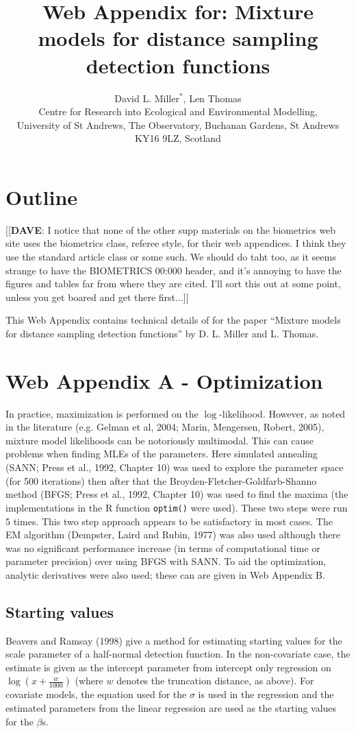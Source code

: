 \documentclass[useAMS,referee]{biom}
\title[Mixture model detection functions]{Web Appendix for: Mixture models for distance sampling detection functions}
\author{David L. Miller$^{*}$\email{dave@ninepointeightone.net}, 
Len Thomas\\
Centre for Research into Ecological and Environmental Modelling,\\
University of St Andrews, The Observatory, Buchanan Gardens, St Andrews KY16 9LZ, Scotland}
\begin{document}
\label{firstpage}

\maketitle

\section*{Outline}

[[\textbf{DAVE}: I notice that none of the other supp materials on the biometrics web site uses the biometrics class, referee style, for their web appendices.  I think they use the standard article class or some such.  We should do taht too, as it seems strange to have the BIOMETRICS 00:000 header, and it's annoying to have the figures and tables far from where they are cited.  I'll sort this out at some point, unless you get boared and get there first...]]

This Web Appendix contains technical details of for the paper ``Mixture models for distance sampling detection functions'' by D. L. Miller and L. Thomas.

\section*{Web Appendix A - Optimization}
\label{s:optimization}

In practice, maximization is performed on the $\log$-likelihood. However, as noted in the literature (e.g. Gelman et al, 2004; Marin, Mengersen, Robert, 2005), mixture model likelihoods can be notoriously multimodal. This can cause problems when finding MLEs of the parameters. Here simulated annealing (SANN; Press et al., 1992, Chapter 10) was used to explore the parameter space (for 500 iterations) then after that the Broyden-Fletcher-Goldfarb-Shanno method (BFGS; Press et al., 1992, Chapter 10) was used to find the maxima (the implementations in the \textsf{R} function \texttt{optim()} were used). These two steps were run 5 times. This two step approach appears to be satisfactory in most cases. The EM algorithm (Dempster, Laird and Rubin, 1977) was also used although there was no significant performance increase (in terms of computational time or parameter precision) over using BFGS with SANN. To aid the optimization, analytic derivatives were also used; these can are given in Web Appendix B.

\subsection*{Starting values}
Beavers and Ramsay (1998) give a method for estimating starting values for the scale parameter of a half-normal detection function. In the non-covariate case, the estimate is given as the intercept parameter from intercept only regression on $\log(x+\frac{w}{1000})$ (where $w$ denotes the truncation distance, as above). For covariate models, the equation used for the $\sigma$ is used in the regression and the estimated parameters from the linear regression are used as the starting values for the $\beta$s.
\end{document}
